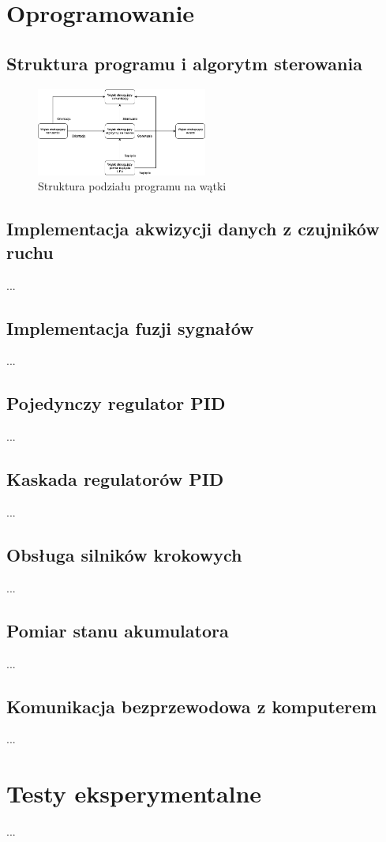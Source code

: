 \section{Oprogramowanie}

\subsection{Struktura programu i algorytm sterowania}

\begin{figure}[h!]
    \centering
    \includegraphics[width=0.5\textwidth]{Rysunki/Rozdzial05/Software.png}
    \caption{Struktura podziału programu na wątki}
    \label{Watki}
\end{figure}

\subsection{Implementacja akwizycji danych z czujników ruchu}
...

\subsection{Implementacja fuzji sygnałów}
...

\subsection{Pojedynczy regulator PID}
...

\subsection{Kaskada regulatorów PID}
...

\subsection{Obsługa silników krokowych}
...

\subsection{Pomiar stanu akumulatora}
...

\subsection{Komunikacja bezprzewodowa z komputerem}
...

\section{Testy eksperymentalne}
...